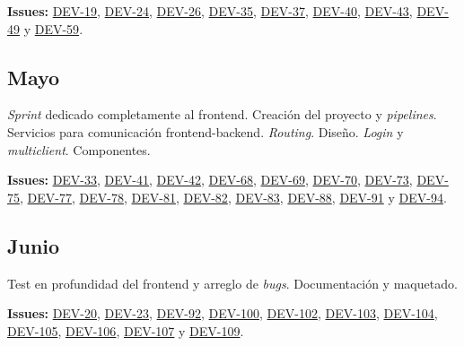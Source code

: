 \bigskip
\textbf{Issues:} \href{https://github.com/harvestcore/tfg/issues/19}{DEV-19},  \href{https://github.com/harvestcore/tfg/issues/24}{DEV-24},  \href{https://github.com/harvestcore/tfg/issues/26}{DEV-26},  \href{https://github.com/harvestcore/tfg/issues/35}{DEV-35},  \href{https://github.com/harvestcore/tfg/issues/37}{DEV-37},  \href{https://github.com/harvestcore/tfg/issues/40}{DEV-40},  \href{https://github.com/harvestcore/tfg/issues/43}{DEV-43},  \href{https://github.com/harvestcore/tfg/issues/49}{DEV-49} y  \href{https://github.com/harvestcore/tfg/issues/59}{DEV-59}.


\subsection{Mayo}
\textit{Sprint} dedicado completamente al frontend. Creación del proyecto y \textit{pipelines}. Servicios para comunicación frontend-backend. \textit{Routing}. Diseño. \textit{Login} y \textit{multiclient}. Componentes.

\bigskip
\textbf{Issues:} \href{https://github.com/harvestcore/tfg/issues/33}{DEV-33}, 
\href{https://github.com/harvestcore/tfg/issues/41}{DEV-41}, 
\href{https://github.com/harvestcore/tfg/issues/42}{DEV-42}, 
\href{https://github.com/harvestcore/tfg/issues/68}{DEV-68}, 
\href{https://github.com/harvestcore/tfg/issues/69}{DEV-69}, 
\href{https://github.com/harvestcore/tfg/issues/70}{DEV-70}, 
\href{https://github.com/harvestcore/tfg/issues/73}{DEV-73}, 
\href{https://github.com/harvestcore/tfg/issues/75}{DEV-75}, 
\href{https://github.com/harvestcore/tfg/issues/77}{DEV-77}, 
\href{https://github.com/harvestcore/tfg/issues/78}{DEV-78}, 
\href{https://github.com/harvestcore/tfg/issues/81}{DEV-81}, 
\href{https://github.com/harvestcore/tfg/issues/82}{DEV-82}, 
\href{https://github.com/harvestcore/tfg/issues/83}{DEV-83}, 
\href{https://github.com/harvestcore/tfg/issues/88}{DEV-88}, 
\href{https://github.com/harvestcore/tfg/issues/91}{DEV-91} y 
\href{https://github.com/harvestcore/tfg/issues/94}{DEV-94}.


\subsection{Junio}
Test en profundidad del frontend y arreglo de \textit{bugs}. Documentación y maquetado.

\bigskip
\textbf{Issues:} \href{https://github.com/harvestcore/tfg/issues/20}{DEV-20}, 
\href{https://github.com/harvestcore/tfg/issues/23}{DEV-23}, 
\href{https://github.com/harvestcore/tfg/issues/92}{DEV-92}, 
\href{https://github.com/harvestcore/tfg/issues/100}{DEV-100}, 
\href{https://github.com/harvestcore/tfg/issues/102}{DEV-102}, 
\href{https://github.com/harvestcore/tfg/issues/103}{DEV-103}, 
\href{https://github.com/harvestcore/tfg/issues/104}{DEV-104}, 
\href{https://github.com/harvestcore/tfg/issues/105}{DEV-105}, 
\href{https://github.com/harvestcore/tfg/issues/106}{DEV-106}, 
\href{https://github.com/harvestcore/tfg/issues/107}{DEV-107} y 
\href{https://github.com/harvestcore/tfg/issues/109}{DEV-109}.
